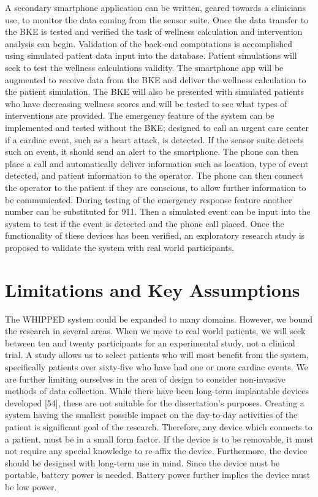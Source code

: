 A secondary smartphone application can be written, geared towards a clinicians use, to monitor the data coming from the sensor suite. Once the data transfer to the BKE is tested and verified the task of wellness calculation and intervention analysis can begin. Validation of the back-end computations is accomplished using simulated patient data input into the database. Patient simulations will seek to test the wellness calculations validity. The smartphone app will be augmented to receive data from the BKE and deliver the wellness calculation to the patient simulation. The BKE will also be presented with simulated patients who have decreasing wellness scores and will be tested to see what types of interventions are provided. The emergency feature of the system can be implemented and tested without the BKE; designed to call an urgent care center if a cardiac event, such as a heart attack, is detected. If the sensor suite detects such an event, it should send an alert to the smartphone. The phone can then place a call and automatically deliver information such as location, type of event detected, and patient information to the operator. The phone can then connect the operator to the patient if they are conscious, to allow further information to be communicated. During testing of the emergency response feature another number can be substituted for 911. Then a simulated event can be input into the system to test if the event is detected and the phone call placed. Once the functionality of these devices has been verified, an exploratory research study is proposed to validate the system with real world participants.

\section{Limitations and Key Assumptions}
\label{sec:LimitationsAndKeyAssumptions}
The WHIPPED system could be expanded to many domains. However, we bound the research in several areas. When we move to real world patients, we will seek between ten and twenty participants for an experimental study, not a clinical trial. A study allows us to select patients who will most benefit from the system, specifically patients over sixty-five who have had one or more cardiac events. We are further limiting ourselves in the area of design to consider non-invasive methods of data collection. While there have been long-term implantable devices developed [54], these are not suitable for the dissertation's purposes. Creating a system having the smallest possible impact on the day-to-day activities of the patient is significant goal of the research. Therefore, any device which connects to a patient, must be in a small form factor. If the device is to be removable, it must not require any special knowledge to re-affix the device.  Furthermore, the device should be designed with long-term use in mind. Since the device must be portable, battery power is needed. Battery power further implies the device must be low power.

